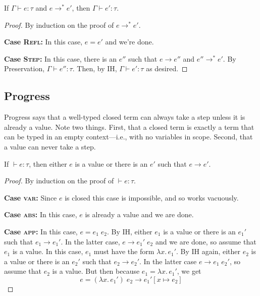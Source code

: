 \documentclass{lecturenotes}
\newcommand{\abs}[2]{\ensuremath{\lambda #1.\,#2}}
\newcommand{\app}[2]{\ensuremath{#1\;#2}}
\begin{document}
\begin{cor}
  If $\Gamma \vdash e \colon \tau$ and $e \to^\ast e'$, then $\Gamma \vdash e' : \tau$.
\end{cor}
\begin{proof}
  By induction on the proof of $e \to^\ast e'$.

  \noindent\textbf{Case \textsc{Refl}:} In this case, $e = e'$ and we're done.

  \noindent\textbf{Case \textsc{Step}:} In this case, there is an $e''$ such that $e \to e''$ and $e'' \to^\ast e'$.
  By Preservation, $\Gamma \vdash e'' \colon \tau$.
  Then, by IH, $\Gamma \vdash e' \colon \tau$ as desired.
\end{proof}

\subsection{Progress}
\label{sec:progress}

Progress says that a well-typed closed term can always take a step unless it is already a value.
Note two things.
First, that a closed term is exactly a term that can be typed in an empty context---i.e., with no variables in scope.
Second, that a value can never take a step.

\begin{thm}[Progress]
  If $\vdash e \colon \tau$, then either $e$ is a value or there is an $e'$ such that $e \to e'$.
\end{thm}
\begin{proof}
  By induction on the proof of $\vdash e \colon \tau$.

  \noindent\textbf{Case \textsc{var}:} Since $e$ is closed this case is impossible, and so works vacuously.

  \noindent\textbf{Case \textsc{abs}:} In this case, $e$ is already a value and we are done.

  \noindent\textbf{Case \textsc{app}:} In this case, $e = \app{e_1}{e_2}$.
  By IH, either $e_1$ is a value or there is an $e_1'$ such that $e_1 \to e_1'$.
  In the latter case, $e \to \app{e_1'}{e_2}$ and we are done, so assume that $e_1$ is a value.
  In this case, $e_1$ must have the form $\abs{x}{e_1'}$.
  By IH again, either $e_2$ is a value or there is an $e_2'$ such that $e_2 \to e_2'$.
  In the latter case $e \to \app{e_1}{e_2'}$, so assume that $e_2$ is a value.
  But then because $e_1 = \abs{x}{e_1'}$, we get $$e = \app{(\abs{x}{e_1'})}{e_2} \to e_1'[x \mapsto e_2]$$
\end{proof}
\end{document}
